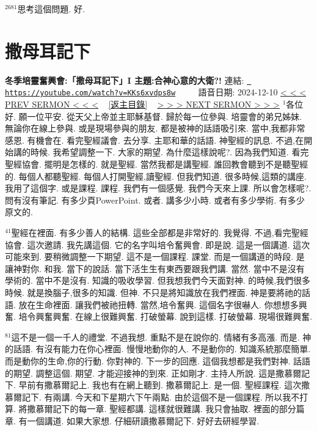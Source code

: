 \documentclass{book}
\begin{document}
$^{2681}$思考這個問題.
好.
\newpage



\section{撒母耳記下}
\label{sec:KKs6xvdps8w}
\textbf{冬季培靈奮興會:「撒母耳記下」I  主題:合神心意的大衛?!}
\newline
\newline
連結: \href{https://youtube.com/watch?v=KKs6xvdps8w}{\texttt{ https://youtube.com/watch?v=KKs6xvdps8w}} ~~~~ 語音日期: 2024-12-10 
\newline
\newline
\hyperref[sec:7tQS0En6sh8]{\small{< < < PREV SERMON < < <}}
~
\hyperref[sec:index]{\small{[返主目錄]}}
~
\hyperref[sec:_dFYhclLeWU]{\small{> > > NEXT SERMON > > >}}
\newline
\newline
$^{1}$各位好.
願一位平安.
從天父上帝並主耶穌基督.
歸於每一位參與.
培靈會的弟兄姊妹.
無論你在線上參與.
或是現場參與的朋友.
都是被神的話語吸引來.
當中,我都非常感恩.
有機會在.
看完聖經議會.
去分享.
主耶和華的話語.
神聖經的訊息.
不過,在開始講的時候.
我希望調整一下.
大家的期望.
為什麼這樣說呢?.
因為我們知道.
看完聖經協會.
擺明是怎樣的.
就是聖經.
當然我都是講聖經.
誰回教會聽到不是聽聖經的.
每個人都聽聖經.
每個人打開聖經,讀聖經.
但我們知道.
很多時候,這類的講座.
我用了這個字.
或是課程.
課程.
我們有一個感覺.
我們今天來上課.
所以會怎樣呢?.
問有沒有筆記.
有多少頁PowerPoint.
或者.
講多少小時.
或者有多少學術.
有多少原文的.

$^{41}$聖經在裡面.
有多少善人的結構.
這些全部都是非常好的.
我覺得.
不過,看完聖經協會.
這次邀請.
我先講這個.
它的名字叫培令奮興會.
即是說.
這是一個講道.
這次可能來到.
要稍微調整一下期望.
這不是一個課程.
課堂.
而是一個講道的時段.
是讓神對你.
和我.
當下的說話.
當下活生生有東西要跟我們講.
當然.
當中不是沒有學術的.
當中不是沒有.
知識的吸收學習.
但我想我們今天面對神.
的時候,我們很多時候.
就是換腦子,很多的知識.
但神.
不只是將知識放在我們裡面.
神是要將祂的話語.
放在生命裡面.
讓我們被祂扭轉.
當然,培令奮興.
這個名字很嚇人.
你想想多興奮.
培令興奮興奮.
在線上很難興奮.
打破螢幕.
說到這樣.
打破螢幕.
現場很難興奮.

$^{81}$這不是一個一千人的禮堂.
不過我想.
重點不是在說你的.
情緒有多高漲.
而是.
神的話語.
有沒有能力在你心裡面.
慢慢地動你的人.
不是動你的.
知識系統那麼簡單.
而是動你的生命,你的行動.
你對神的.
下一步的回應.
這個我想都是我們對神.
話語的期望.
調整這個.
期望.
才能迎接神的到來.
正如剛才.
主持人所說.
這是撒慕爾記下.
早前有撒慕爾記上.
我也有在網上聽到.
撒慕爾記上.
是一個.
聖經課程.
這次撒慕爾記下.
有兩講.
今天和下星期六下午兩點.
由於這個不是一個課程.
所以我不打算.
將撒慕爾記下的每一章.
聖經都講.
這樣就很難講.
我只會抽取.
裡面的部分篇章.
有一個講道.
如果大家想.
仔細研讀撒慕爾記下.
好好去研經學習.
\end{document}
